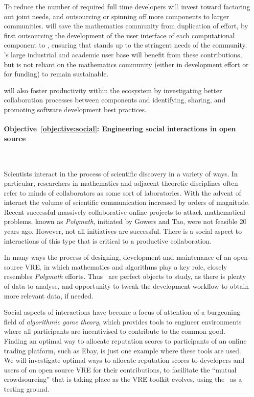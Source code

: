\documentclass[noworkareas,deliverables,\classoptions]{euproposal}       %
\begin{document}
\begin{proposal}

To reduce the number of required full time developers \TheProject will
invest toward factoring out joint needs, and outsourcing or spinning
off more components to larger communities.  \TheProject will save the
mathematics community from duplication of effort, by first outsourcing
the development of the user interface of each computational component
to \Jupyter, ensuring that \Jupyter stands up to the stringent needs
of the community. \Jupyter's large industrial and academic user base
will benefit from these contributions, but is not reliant on the
mathematics community (either in development effort or for funding) to
remain sustainable.

\TheProject will also foster productivity within the ecosystem by
investigating better collaboration processes between components and
identifying, sharing, and promoting software development best
practices.

\paragraph{Objective~\ref{objective:social}: Engineering social
  interactions in open source \VREs}\ 

Scientists interact in the process of scientific discovery in a
variety of ways.  In particular, researchers in mathematics and
adjacent theoretic disciplines often refer to minds of collaborators
as some sort of laboratories. With the advent of internet the volume
of scientific communication increased by orders of magnitude. Recent
successful massively collaborative online projects to attack
mathematical problems, known as \emph{Polymath}, initiated by Gowers
and Tao, were not feasible 20 years ago. However, not all initiatives
are successful. There is a social aspect to interactions of this type
that is critical to a productive collaboration.

In many ways the process of designing, development and maintenance of
an open-source VRE, in which mathematics and algorithms play a key
role, closely resembles \emph{Polymath} efforts.  Thus \TheProject\
\VREs are perfect objects to study, as there is plenty of data to
analyse, and opportunity to tweak the development workflow to obtain
more relevant data, if needed.

Social aspects of interactions have become a focus of attention of a
burgeoning field of \emph{algorithmic game theory}, which provides
tools to engineer environments where all participants are incentivised
to contribute to the common good.  Finding an optimal way to allocate
reputation scores to participants of an online trading platform, such
as Ebay, is just one example where these tools are used. We will
investigate optimal ways to allocate reputation scores to developers
and users of on open source VRE for their contributions, to facilitate
the ``mutual crowdsourcing'' that is taking place as the VRE toolkit
evolves, using the \TheProject\ \VREs as a testing ground.


\end{proposal}
\end{document}
